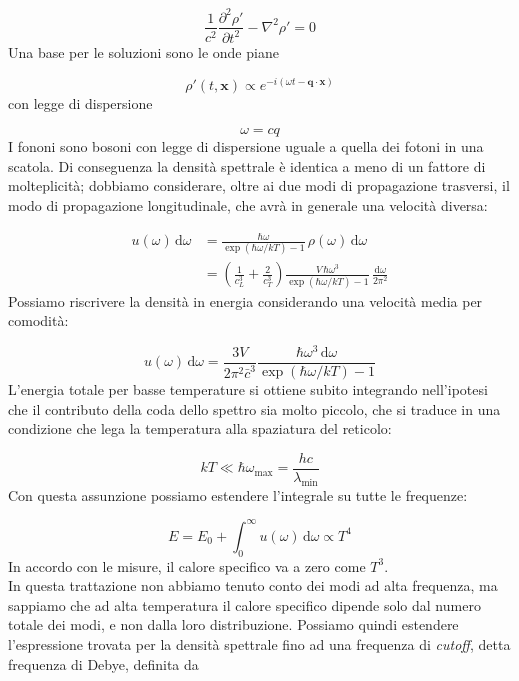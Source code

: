 \documentclass[a4paper]{report}
\begin{document}
\begin{equation}
     \frac{1}{c^2}\frac{\partial^2\rho'}{\partial t^2} - \nabla^2\rho' = 0
\end{equation}
Una base per le soluzioni sono le onde piane

\begin{equation}
    \rho'(t,\mathbf{x}) \propto e^{-i(\omega t - \mathbf{q}\cdot\mathbf{x})}
\end{equation}
con legge di dispersione

\begin{equation}
    \omega = c q
\end{equation}
I fononi sono bosoni con legge di dispersione uguale a quella dei fotoni in una scatola. Di conseguenza la densità spettrale è identica a meno di un fattore di molteplicità; dobbiamo considerare, oltre ai due modi di propagazione trasversi, il modo di propagazione longitudinale, che avrà in generale una velocità diversa:

\begin{equation}
    \begin{split}
        u(\omega)\,\mathrm{d}\omega & = \frac{\hbar \omega}{\exp(\hbar\omega/k T)-1}\,\rho(\omega)\,\mathrm{d}\omega \\
        & = \left(\frac{1}{c_L^3}+\frac{2}{c_T^3}\right)\frac{V\,\hbar \omega^3}{\exp(\hbar\omega/k T)-1}\,\frac{\mathrm{d}\omega}{2\pi^2}
    \end{split}
\end{equation}
Possiamo riscrivere la densità in energia considerando una velocità media per comodità:

\begin{equation}
    u(\omega)\,\mathrm{d}\omega = \frac{3V}{2\pi^2\bar{c}^3}\frac{\hbar \omega^3\,\mathrm{d}\omega}{\exp(\hbar\omega/k T)-1}
\end{equation}
L'energia totale per basse temperature si ottiene subito integrando nell'ipotesi che il contributo della coda dello spettro sia molto piccolo, che si traduce in una condizione che lega la temperatura alla spaziatura del reticolo:

\begin{equation}
    k T \ll \hbar\omega_{\text{max}} = \frac{h c}{\lambda_{\text{min}}}
\end{equation}
Con questa assunzione possiamo estendere l'integrale su tutte le frequenze:

\begin{equation}
    E = E_0 + \int_0^{\infty} u(\omega)\,\mathrm{d}\omega \propto T^4
\end{equation}
In accordo con le misure, il calore specifico va a zero come $T^3$. \\
In questa trattazione non abbiamo tenuto conto dei modi ad alta frequenza, ma sappiamo che ad alta temperatura il calore specifico dipende solo dal numero totale dei modi, e non dalla loro distribuzione. Possiamo quindi estendere l'espressione trovata per la densità spettrale fino ad una frequenza di \textit{cutoff}, detta frequenza di Debye, definita da
\end{document}
